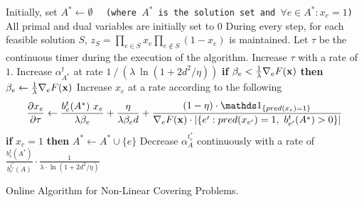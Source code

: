 \begin{algorithm}[ht]
\begin{algorithmic}[1]
\STATE Initially, set $A^* \gets \emptyset$ \ \ \texttt{(where $A^*$ is the solution set and $\forall e \in A^* : x_{e} = 1$)}
\STATE All primal and dual variables are initially set to 0
\STATE During every step, for each feasible solution $S$, $z_{S} = \prod_{e \in S} x_{e} \prod_{e \notin S} (1 - x_{e})$ is maintained.
\STATE Let $\tau$ be the continuous timer during the execution of the algorithm.
		\STATE Increase $\tau$ with a rate of $1$.
		\STATE Increase $\alpha^{t}_{A^{*}}$ at rate $1\ /\ (\lambda \ \ln(1+2d^{2}/\eta))$
		\label{algo-covering:alpha}
			\STATE \textbf{if} $\beta_{e} <  \frac{1}{\lambda} \nabla_{e} F(\mathbf{x})$ \textbf{then}
			$\beta_{e} \gets \frac{1}{\lambda} \nabla_{e} F(\mathbf{x})$
			\label{algo-covering:beta}
			\STATE Increase $x_{e}$ at a rate according to the following
			\begin{align*}
				\frac{\partial x_{e}}{\partial \tau}	\gets
				\frac{b^{t}_{e}(A^{*}) \ x_{e}}{\lambda \beta_{e}} + \frac{\eta}{\lambda \beta_{e} d}
				+ \frac{(1 - \eta) \cdot \one_{\{pred(x_{e}) = 1\}}}{\nabla_{e} F(\vect{x}) \cdot |\{e': pred(x_{e'}) = 1,\ b^{t}_{e'}(A^{*}) > 0\}| }
			\end{align*}
			\label{algo-covering:x}
		\ENDFOR
		\STATE \textbf{if} $x_{e} = 1$ \textbf{then} $A^{*} \gets A^{*} \cup \{e\}$
		 \label{algo-decrease}
						\STATE Decrease $\alpha^{t_{e}^{*}}_{A}$ continuously with a rate of
						$\frac{b^{t}_{e}(A^{*})}{b^{t_{e}^{*}}_{e}(A)} \cdot\frac{1}{\lambda \cdot \ln(1+2d^{2}/\eta)}$
						\label{algo-covering:decrease}
				\ENDFOR
			\ENDWHILE
		\ENDFOR
	\ENDWHILE
\ENDFOR
\end{algorithmic}
\caption{Online Algorithm for Non-Linear Covering Problems.}
\label{algo:covering}
\end{algorithm}


